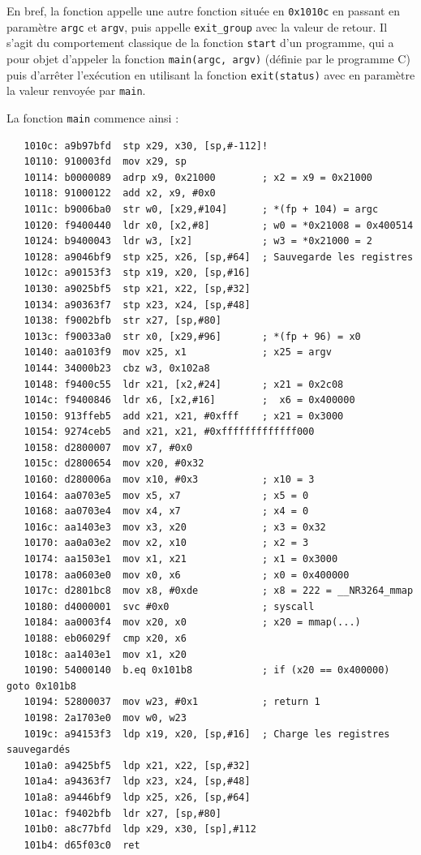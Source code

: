 \documentclass[a4paper,10pt]{article}
\begin{document}
En bref, la fonction appelle une autre fonction située en \texttt{0x1010c} en passant en paramètre \texttt{argc} et \texttt{argv}, puis appelle \texttt{exit\_group} avec la valeur de retour. Il s'agit du comportement classique de la fonction \texttt{start} d'un programme, qui a pour objet d'appeler la fonction \texttt{main(argc, argv)} (définie par le programme C) puis d'arrêter l'exécution en utilisant la fonction \texttt{exit(status)} avec en paramètre la valeur renvoyée par \texttt{main}.

La fonction \texttt{main} commence ainsi :
\begin{verbatim}
   1010c: a9b97bfd  stp x29, x30, [sp,#-112]!
   10110: 910003fd  mov x29, sp
   10114: b0000089  adrp x9, 0x21000        ; x2 = x9 = 0x21000
   10118: 91000122  add x2, x9, #0x0
   1011c: b9006ba0  str w0, [x29,#104]      ; *(fp + 104) = argc
   10120: f9400440  ldr x0, [x2,#8]         ; w0 = *0x21008 = 0x400514
   10124: b9400043  ldr w3, [x2]            ; w3 = *0x21000 = 2
   10128: a9046bf9  stp x25, x26, [sp,#64]  ; Sauvegarde les registres
   1012c: a90153f3  stp x19, x20, [sp,#16]
   10130: a9025bf5  stp x21, x22, [sp,#32]
   10134: a90363f7  stp x23, x24, [sp,#48]
   10138: f9002bfb  str x27, [sp,#80]
   1013c: f90033a0  str x0, [x29,#96]       ; *(fp + 96) = x0
   10140: aa0103f9  mov x25, x1             ; x25 = argv
   10144: 34000b23  cbz w3, 0x102a8
   10148: f9400c55  ldr x21, [x2,#24]       ; x21 = 0x2c08
   1014c: f9400846  ldr x6, [x2,#16]        ;  x6 = 0x400000
   10150: 913ffeb5  add x21, x21, #0xfff    ; x21 = 0x3000
   10154: 9274ceb5  and x21, x21, #0xfffffffffffff000
   10158: d2800007  mov x7, #0x0
   1015c: d2800654  mov x20, #0x32
   10160: d280006a  mov x10, #0x3           ; x10 = 3
   10164: aa0703e5  mov x5, x7              ; x5 = 0
   10168: aa0703e4  mov x4, x7              ; x4 = 0
   1016c: aa1403e3  mov x3, x20             ; x3 = 0x32
   10170: aa0a03e2  mov x2, x10             ; x2 = 3
   10174: aa1503e1  mov x1, x21             ; x1 = 0x3000
   10178: aa0603e0  mov x0, x6              ; x0 = 0x400000
   1017c: d2801bc8  mov x8, #0xde           ; x8 = 222 = __NR3264_mmap
   10180: d4000001  svc #0x0                ; syscall
   10184: aa0003f4  mov x20, x0             ; x20 = mmap(...)
   10188: eb06029f  cmp x20, x6
   1018c: aa1403e1  mov x1, x20
   10190: 54000140  b.eq 0x101b8            ; if (x20 == 0x400000) goto 0x101b8
   10194: 52800037  mov w23, #0x1           ; return 1
   10198: 2a1703e0  mov w0, w23
   1019c: a94153f3  ldp x19, x20, [sp,#16]  ; Charge les registres sauvegardés
   101a0: a9425bf5  ldp x21, x22, [sp,#32]
   101a4: a94363f7  ldp x23, x24, [sp,#48]
   101a8: a9446bf9  ldp x25, x26, [sp,#64]
   101ac: f9402bfb  ldr x27, [sp,#80]
   101b0: a8c77bfd  ldp x29, x30, [sp],#112
   101b4: d65f03c0  ret
\end{verbatim}
\end{document}
